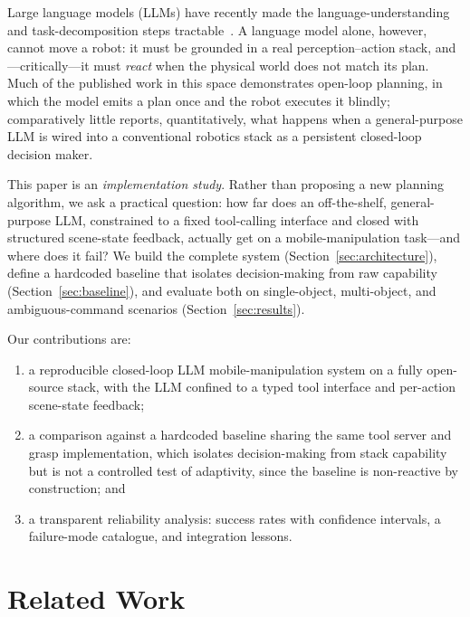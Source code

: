 \documentclass[conference]{IEEEtran}
\begin{document}
Large language models (LLMs) have recently made the language-understanding
and task-decomposition steps tractable~\cite{saycan,codeaspolicies}. A
language model alone, however, cannot move a robot: it must be grounded in
a real perception--action stack, and---critically---it must \emph{react}
when the physical world does not match its plan. Much of the published
work in this space demonstrates open-loop planning, in which the model
emits a plan once and the robot executes it blindly; comparatively little
reports, quantitatively, what happens when a general-purpose LLM is wired
into a conventional robotics stack as a persistent closed-loop decision
maker.

This paper is an \emph{implementation study}. Rather than proposing a new
planning algorithm, we ask a practical question: how far does an
off-the-shelf, general-purpose LLM, constrained to a fixed tool-calling
interface and closed with structured scene-state feedback, actually get on
a mobile-manipulation task---and where does it fail? We build
the complete system (Section~\ref{sec:architecture}), define a hardcoded
baseline that isolates decision-making from raw capability
(Section~\ref{sec:baseline}), and evaluate both on single-object,
multi-object, and ambiguous-command scenarios
(Section~\ref{sec:results}).

Our contributions are:
\begin{enumerate}
    \item a reproducible closed-loop LLM mobile-manipulation system on a
    fully open-source stack, with the LLM confined to a typed tool
    interface and per-action scene-state feedback;
    \item a comparison against a hardcoded baseline sharing the same tool
    server and grasp implementation, which isolates decision-making from
    stack capability but
    is not a controlled test of adaptivity, since the baseline is
    non-reactive by construction; and
    \item a transparent reliability analysis: success rates with confidence
    intervals, a failure-mode catalogue, and integration lessons.
\end{enumerate}

\section{Related Work}
\label{sec:related}
\end{document}
